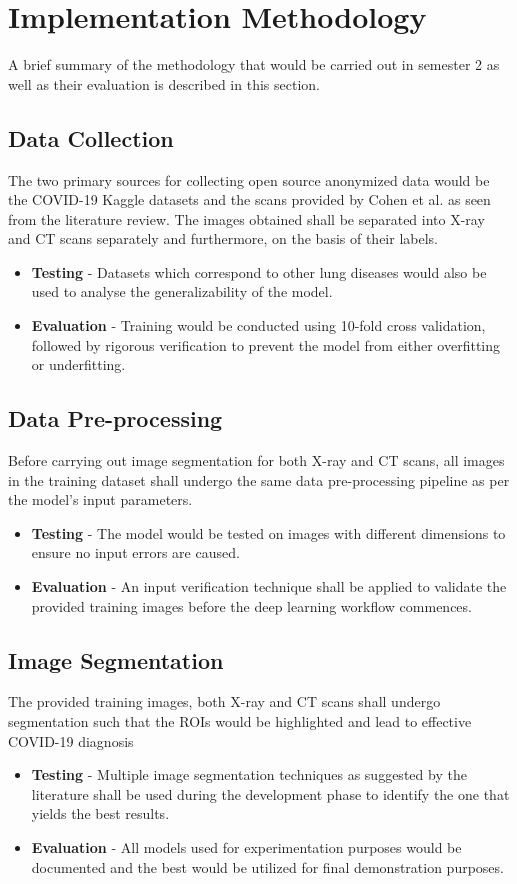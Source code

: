    
\section{Implementation Methodology}
A brief summary of the methodology that would be carried out in semester 2 as well as their evaluation is described in this section.
\subsection{Data Collection}
The two primary sources for collecting open source anonymized data would be the COVID-19 Kaggle datasets and the scans provided by Cohen et al. \cite{JMD2020} as seen from the literature review. The images obtained shall be separated into X-ray and CT scans separately and furthermore, on the basis of their labels.
\begin{itemize}
    \item \textbf{Testing} - Datasets which correspond to other lung diseases would also be used to analyse the generalizability of the model.
     \item \textbf{Evaluation} - Training would be conducted using  10-fold cross validation, followed by rigorous verification to prevent the model from either overfitting or underfitting.
\end{itemize}
\subsection{Data Pre-processing}
Before carrying out image segmentation for both X-ray and CT scans, all images in the training dataset shall undergo the same data pre-processing pipeline as per the model's input parameters.
\begin{itemize}
    \item \textbf{Testing} - The model would be tested on images  with different dimensions to ensure no input errors are caused.
     \item \textbf{Evaluation} - An input verification technique shall be applied to validate the provided training images before the deep learning workflow commences.
\end{itemize}
\subsection{Image Segmentation}
The provided training images, both X-ray and CT scans shall undergo segmentation such that the ROIs would be highlighted and lead to effective COVID-19 diagnosis
\begin{itemize}
    \item \textbf{Testing} - Multiple image segmentation techniques as suggested by the literature shall be used during the development phase to identify the one that yields the best results.
     \item \textbf{Evaluation} - All models used for experimentation purposes would be documented and the best would be utilized for final demonstration purposes.
\end{itemize}
